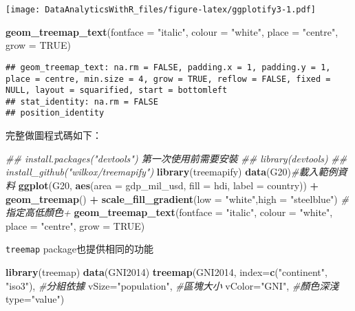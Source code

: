\documentclass[
]{book}
\newenvironment{Shaded}{\begin{snugshade}}{\end{snugshade}}
\newcommand{\CommentTok}[1]{\textcolor[rgb]{0.56,0.35,0.01}{\textit{#1}}}
\newcommand{\DataTypeTok}[1]{\textcolor[rgb]{0.13,0.29,0.53}{#1}}
\newcommand{\KeywordTok}[1]{\textcolor[rgb]{0.13,0.29,0.53}{\textbf{#1}}}
\newcommand{\NormalTok}[1]{#1}
\newcommand{\OperatorTok}[1]{\textcolor[rgb]{0.81,0.36,0.00}{\textbf{#1}}}
\newcommand{\OtherTok}[1]{\textcolor[rgb]{0.56,0.35,0.01}{#1}}
\newcommand{\StringTok}[1]{\textcolor[rgb]{0.31,0.60,0.02}{#1}}
\begin{document}
\texttt{[image: DataAnalyticsWithR\_files/figure-latex/ggplotify3-1.pdf]}

\begin{Shaded}
\begin{Highlighting}[]
  \KeywordTok{geom_treemap_text}\NormalTok{(}\DataTypeTok{fontface =} \StringTok{"italic"}\NormalTok{, }\DataTypeTok{colour =} \StringTok{"white"}\NormalTok{, }\DataTypeTok{place =} \StringTok{"centre"}\NormalTok{,}
                    \DataTypeTok{grow =} \OtherTok{TRUE}\NormalTok{)}
\end{Highlighting}
\end{Shaded}

\begin{verbatim}
## geom_treemap_text: na.rm = FALSE, padding.x = 1, padding.y = 1, place = centre, min.size = 4, grow = TRUE, reflow = FALSE, fixed = NULL, layout = squarified, start = bottomleft
## stat_identity: na.rm = FALSE
## position_identity
\end{verbatim}

完整做圖程式碼如下：

\begin{Shaded}
\begin{Highlighting}[]
\CommentTok{## install.packages("devtools") 第一次使用前需要安裝}
\CommentTok{## library(devtools)}
\CommentTok{## install_github("wilkox/treemapify") }
\KeywordTok{library}\NormalTok{(treemapify)}
\KeywordTok{data}\NormalTok{(G20)}\CommentTok{#載入範例資料}
\KeywordTok{ggplot}\NormalTok{(G20, }\KeywordTok{aes}\NormalTok{(}\DataTypeTok{area =}\NormalTok{ gdp_mil_usd, }\DataTypeTok{fill =}\NormalTok{ hdi, }\DataTypeTok{label =}\NormalTok{ country)) }\OperatorTok{+}
\StringTok{  }\KeywordTok{geom_treemap}\NormalTok{() }\OperatorTok{+}\StringTok{ }
\StringTok{  }\KeywordTok{scale_fill_gradient}\NormalTok{(}\DataTypeTok{low =} \StringTok{"white"}\NormalTok{,}\DataTypeTok{high =} \StringTok{"steelblue"}\NormalTok{) }\CommentTok{#指定高低顏色+}
  \KeywordTok{geom_treemap_text}\NormalTok{(}\DataTypeTok{fontface =} \StringTok{"italic"}\NormalTok{, }\DataTypeTok{colour =} \StringTok{"white"}\NormalTok{, }\DataTypeTok{place =} \StringTok{"centre"}\NormalTok{,}
                    \DataTypeTok{grow =} \OtherTok{TRUE}\NormalTok{)}
\end{Highlighting}
\end{Shaded}

\texttt{treemap}\citep{R-treemap} package也提供相同的功能

\begin{Shaded}
\begin{Highlighting}[]
\KeywordTok{library}\NormalTok{(treemap)}
\KeywordTok{data}\NormalTok{(GNI2014)}
\KeywordTok{treemap}\NormalTok{(GNI2014,}
       \DataTypeTok{index=}\KeywordTok{c}\NormalTok{(}\StringTok{"continent"}\NormalTok{, }\StringTok{"iso3"}\NormalTok{), }\CommentTok{#分組依據}
       \DataTypeTok{vSize=}\StringTok{"population"}\NormalTok{, }\CommentTok{#區塊大小}
       \DataTypeTok{vColor=}\StringTok{"GNI"}\NormalTok{, }\CommentTok{#顏色深淺}
       \DataTypeTok{type=}\StringTok{"value"}\NormalTok{)}
\end{Highlighting}
\end{Shaded}
\end{document}
